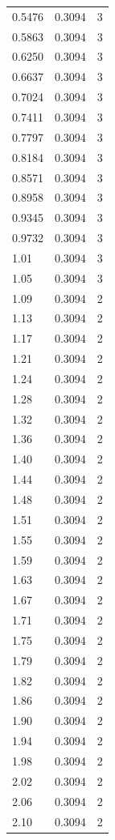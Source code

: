 \begin{longtable}{lrr}
  0.5476 & 0.3094 & 3 \\
  0.5863 & 0.3094 & 3 \\
  0.6250 & 0.3094 & 3 \\
  0.6637 & 0.3094 & 3 \\
  0.7024 & 0.3094 & 3 \\
  0.7411 & 0.3094 & 3 \\
  0.7797 & 0.3094 & 3 \\
  0.8184 & 0.3094 & 3 \\
  0.8571 & 0.3094 & 3 \\
  0.8958 & 0.3094 & 3 \\
  0.9345 & 0.3094 & 3 \\
  0.9732 & 0.3094 & 3 \\
  1.01 & 0.3094 & 3 \\
  1.05 & 0.3094 & 3 \\
  1.09 & 0.3094 & 2 \\
  1.13 & 0.3094 & 2 \\
  1.17 & 0.3094 & 2 \\
  1.21 & 0.3094 & 2 \\
  1.24 & 0.3094 & 2 \\
  1.28 & 0.3094 & 2 \\
  1.32 & 0.3094 & 2 \\
  1.36 & 0.3094 & 2 \\
  1.40 & 0.3094 & 2 \\
  1.44 & 0.3094 & 2 \\
  1.48 & 0.3094 & 2 \\
  1.51 & 0.3094 & 2 \\
  1.55 & 0.3094 & 2 \\
  1.59 & 0.3094 & 2 \\
  1.63 & 0.3094 & 2 \\
  1.67 & 0.3094 & 2 \\
  1.71 & 0.3094 & 2 \\
  1.75 & 0.3094 & 2 \\
  1.79 & 0.3094 & 2 \\
  1.82 & 0.3094 & 2 \\
  1.86 & 0.3094 & 2 \\
  1.90 & 0.3094 & 2 \\
  1.94 & 0.3094 & 2 \\
  1.98 & 0.3094 & 2 \\
  2.02 & 0.3094 & 2 \\
  2.06 & 0.3094 & 2 \\
  2.10 & 0.3094 & 2 \\

\end{longtable}
